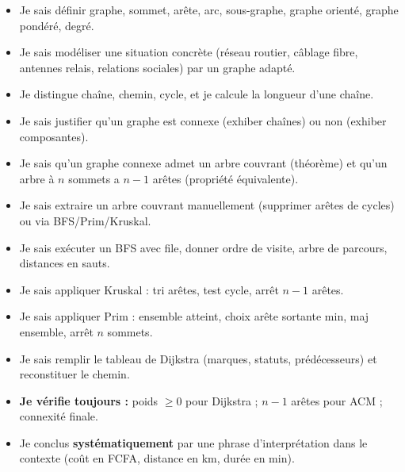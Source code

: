 \documentclass[11pt]{article}
\begin{document}
\begin{aretenir}
\begin{itemize}
  \item[$\square$] Je sais définir graphe, sommet, arête, arc, sous-graphe, graphe orienté, graphe pondéré, degré.
  \item[$\square$] Je sais modéliser une situation concrète (réseau routier, câblage fibre, antennes relais, relations sociales) par un graphe adapté.
  \item[$\square$] Je distingue chaîne, chemin, cycle, et je calcule la longueur d'une chaîne.
  \item[$\square$] Je sais justifier qu'un graphe est connexe (exhiber chaînes) ou non (exhiber composantes).
  \item[$\square$] Je sais qu'un graphe connexe admet un arbre couvrant (théorème) et qu'un arbre à $n$ sommets a $n-1$ arêtes (propriété équivalente).
  \item[$\square$] Je sais extraire un arbre couvrant manuellement (supprimer arêtes de cycles) ou via BFS/Prim/Kruskal.
  \item[$\square$] Je sais exécuter un BFS avec file, donner ordre de visite, arbre de parcours, distances en sauts.
  \item[$\square$] Je sais appliquer Kruskal : tri arêtes, test cycle, arrêt $n-1$ arêtes.
  \item[$\square$] Je sais appliquer Prim : ensemble atteint, choix arête sortante min, maj ensemble, arrêt $n$ sommets.
  \item[$\square$] Je sais remplir le tableau de Dijkstra (marques, statuts, prédécesseurs) et reconstituer le chemin.
  \item[$\square$] \textbf{Je vérifie toujours :} poids $\ge 0$ pour Dijkstra ; $n-1$ arêtes pour ACM ; connexité finale.
  \item[$\square$] Je conclus \textbf{systématiquement} par une phrase d'interprétation dans le contexte (coût en FCFA, distance en km, durée en min).
\end{itemize}
\end{aretenir}
\end{document}
